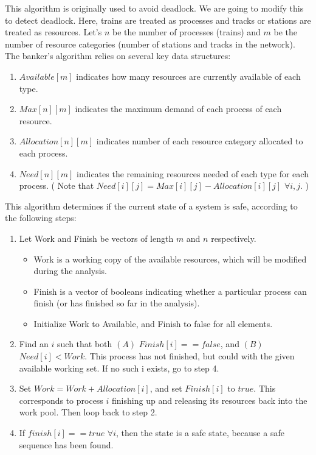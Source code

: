 This algorithm is originally used to avoid deadlock. We are going to modify this to detect deadlock.
Here, trains are treated as processes and tracks or stations are treated as resources.
Let's $n$ be the number of processes (trains) and $m$ be the number of resource categories (number of stations and tracks in 
the network). The banker's algorithm relies on several key data structures:
\begin{enumerate}
\item $Available[m]$ indicates how many resources are currently available of each type.
\item $Max[n][m]$ indicates the maximum demand of each process of each resource.
\item $Allocation[n][m]$ indicates number of each resource category allocated to each process.
\item $Need[n][m]$ indicates the remaining resources needed of each type for each process. 
( Note that $Need[i][j] = Max[i][j] - Allocation[i][j]$   $\forall i, j$. )
\end{enumerate}

This algorithm determines if the current state of a system is safe, according to the following steps:
\begin{enumerate}
\item Let Work and Finish be vectors of length $m$ and $n$ respectively.
\begin{itemize}
\item Work is a working copy of the available resources, which will be modified during the analysis.
\item Finish is a vector of booleans indicating whether a particular process can finish (or has finished so far in the analysis).
\item Initialize Work to Available, and Finish to false for all elements.
\end{itemize}
\item Find an $i$ such that both $(A)$ $Finish[ i ] == false$, and $(B)$ $Need[i] < Work$. This process has not finished, but could with the given available working set. If no such i exists, go to step 4.
\item Set $Work = Work + Allocation[i]$, and set $Finish[i]$ to $true$. This corresponds to process $i$ finishing up and releasing its resources back 
        into the work pool. Then loop back to step 2.
\item If $finish[i] == true$  $ \forall i$, then the state is a safe state, because a safe sequence has been found.
\end{enumerate}

